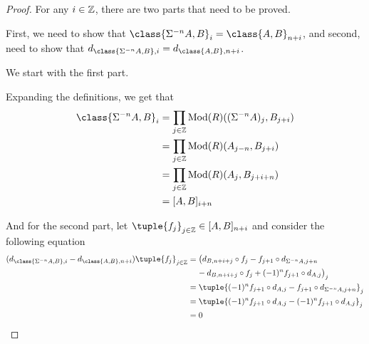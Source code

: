 \begin{proof}
    For any \( i \in {\mathbb{Z}} \), there are two parts that need to be proved.

    First, we need to show that \( \class{\Sigma^{-n} A, B}_i = \class{A, B}_{n + i} \), and second, need to show that \( d_{\class{\Sigma^{-n} A, B}, i} = d_{\class{A, B}, n + i} \).

    We start with the first part.

    Expanding the definitions, we get that
    \begin{align*}
        \class{\Sigma^{-n} A, B}_i &= \prod_{j \in \Zb} \Mod(R)((\Sigma^{-n} A)_j, B_{j + i}) \\
        &= \prod_{j \in \Zb} \Mod(R)(A_{j - n}, B_{j + i}) \\
        &= \prod_{j \in \Zb} \Mod(R)(A_j, B_{j + i + n}) \\
        &= [A, B]_{i + n}
    \end{align*}

    And for the second part, let \( \tuple{f_j}_{j \in \Zb} \in [A, B]_{n + i} \) and consider the following equation
    \begin{align*}
        (d_{\class{\Sigma^{-n} A, B}, i} - d_{\class{A, B}, n + i})\tuple{f_j}_{j \in \Zb} &= \big(d_{B, n + i + j} \circ f_j - f_{j + 1} \circ d_{\Sigma^{-n} A, j + n} \\
        &\hspace{0.4cm} - d_{B, n + i + j} \circ f_j + (-1)^n f_{j + 1} \circ d_{A, j}\big)_j \\
        &= \tuple{(-1)^n f_{j + 1} \circ d_{A, j} - f_{j + 1} \circ d_{\Sigma^{-n} A, j + n}}_j \\
        &= \tuple{(-1)^n f_{j + 1} \circ d_{A, j} - (-1)^n f_{j + 1} \circ d_{A, j}}_j \\
        &= 0 \qedhere
    \end{align*}
\end{proof}



